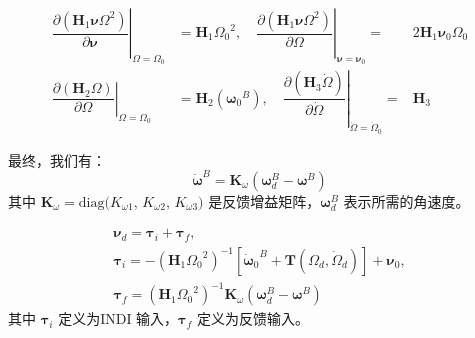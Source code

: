 \begin{equation}
	\begin{array}{ccccc}
	{\left. {\dfrac{{\partial ({{\boldsymbol{H}}_1}{\boldsymbol{\nu }}{\Omega ^2})}}{{\partial {\boldsymbol{\nu }}}}} \right|_{\Omega  = {\Omega _0}}} &  = {{\boldsymbol{H}}_1}{\Omega _0}^2  ,\quad{\left. {     \dfrac{{\partial ({{\boldsymbol{H}}_1}{\boldsymbol{\nu }}{\Omega ^2})}}{{\partial \Omega }}} \right|_{{\boldsymbol{\nu }} = {{\boldsymbol{\nu }}_0}}} =  & 2{{\boldsymbol{H}}_1}{{\boldsymbol{\nu }}_0}{\Omega _0}\\
	{\left. {\dfrac{{\partial ({{\boldsymbol{H}}_2}\Omega )}}{{\partial \Omega }}} \right|_{\Omega  = {\Omega _0}}} &  = {{\boldsymbol{H}}_2}({{\boldsymbol{\omega }}_0}^B),\quad {\left. {      \dfrac{{\partial ({{\boldsymbol{H}}_3}\dot \Omega )}}{{\partial \dot \Omega }}} \right|_{\dot \Omega  = {{\dot \Omega }_0}}} =  & {{\boldsymbol{H}}_3}
	\end{array}
	\label{eq_20}
\end{equation}

最终，我们有：
\begin{equation}
	{{\boldsymbol{\dot \omega }}^B} = {{\boldsymbol{K}}_\omega }({\boldsymbol{\omega }}_d^B - {{\boldsymbol{\omega }}^B})
	\label{eq_27}
\end{equation}
其中 ${{\boldsymbol{K}}_{\omega }}=\text{diag}({{K}_{\omega 1}}$, ${{K}_{\omega 2}}$, ${{K}_{\omega 3}})$ 是反馈增益矩阵，$\boldsymbol{\omega }_{d}^{B}$ 表示所需的角速度。


\begin{equation}
	\begin{array}{l}
	{{\boldsymbol{\nu }}_d} = {{\boldsymbol{\tau }}_i} + {{\boldsymbol{\tau }}_f},\\
	{{\boldsymbol{\tau }}_i} =  - {\left( {{{\boldsymbol{H}}_1}{\Omega _0}^2} \right)^{ - 1}}\left[ {{{{\boldsymbol{\dot \omega }}}_0}^B + {\boldsymbol{T}}({\Omega _d},{{\dot \Omega }_d})} \right] + {{\boldsymbol{\nu }}_0},\\
	{{\boldsymbol{\tau }}_f} = {\left( {{{\boldsymbol{H}}_1}{\Omega _0}^2} \right)^{ - 1}}{{\boldsymbol{K}}_\omega }({\boldsymbol{\omega }}_d^B - {{\boldsymbol{\omega }}^B})
	\end{array}
	\label{eq_28}
\end{equation}
其中 ${{\boldsymbol{\tau }}_{i}}$ 定义为INDI 输入，${{\boldsymbol{\tau }}_{f}}$ 定义为反馈输入。

